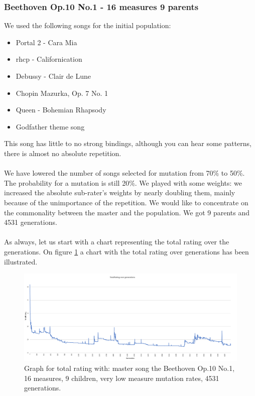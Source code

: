 \documentclass[a4paper]{article}
\begin{document}
\subsubsection{Beethoven Op.10 No.1 - 16 measures 9 parents}
We used the following songs for the initial population:
\begin{itemize}
\item Portal 2 - Cara Mia
\item rhcp - Californication 
\item Debussy - Clair de Lune
\item Chopin Mazurka, Op. 7 No. 1
\item Queen - Bohemian Rhapsody 
\item Godfather theme song
\end{itemize}

This song has little to no strong bindings, although you can hear some patterns, there is almost no absolute repetition.
\\\\
We have lowered the number of songs selected for mutation from 70\% to 50\%. The probability for a mutation is still 20\%. We played with some weights: we increased the absolute sub-rater's weights by nearly doubling them, mainly because of the unimportance of the repetition. We would like to concentrate on the commonality between the master and the population. We got 9 parents and 4531 generations.
\\\\
As always, let us start with a chart representing the total rating over the generations. On figure \ref{fig:beethoven_1} a chart with the total rating over generations has been illustrated.

\begin{figure}[H]
	\advance\leftskip-1.5cm
	\includegraphics[width=1.2\textwidth]{Fotos/results/beethoven/total_rating_graph.png}
	\caption{Graph for total rating with: master song the Beethoven Op.10 No.1, 16 measures, 9 children, very low measure mutation rates, 4531 generations.}
	\label{fig:beethoven_1}
\end{figure}
\end{document}
